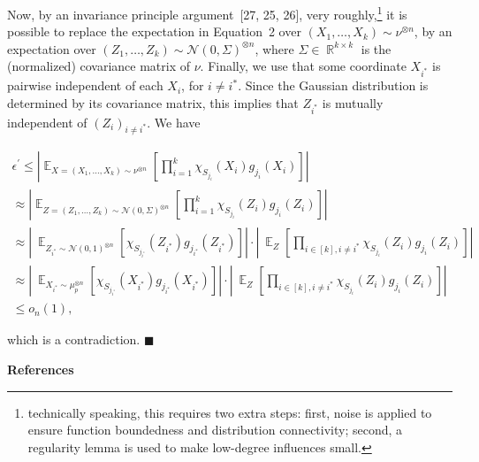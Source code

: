 \documentclass[10pt,a4paper]{article}
\begin{document}
Now, by an invariance principle argument [27, 25, 26], very roughly,\footnote{technically speaking, this requires two extra steps: first, noise is applied to ensure function boundedness and distribution connectivity; second, a regularity lemma is used to make low-degree influences small.} it is possible to replace the expectation in Equation 2 over $(X_{1},\dots,X_{k})\sim\nu^{\otimes n}$, by an expectation over $(Z_{1},\dots,Z_{k})\sim\mathcal{N}(0,\Sigma)^{\otimes n}$, where $\Sigma\in\mathop{\mathbb{R}}^{k\times k}$ is the (normalized) covariance matrix of $\nu$.
Finally, we use that some coordinate $X_{i^{*}}$ is pairwise independent of each $X_{i}$, for $i\not=i^{*}$.
Since the Gaussian distribution is determined by its covariance matrix, this implies that $Z_{i^{*}}$ is mutually independent of $(Z_{i})_{i\not=i^{*}}$.
We have\par


\[\begin{gathered}
\displaystyle\epsilon^{\prime} \displaystyle\leqslant\left|\mathop{\mathbb{E}}_{X=(X_{1},\dots,X_{k})\sim\nu^{\otimes n}}\left[\prod_{i=1}^{k}\chi_{S_{j_{i}}}(X_{i})g_{j_{i}}(X_{i})\right]\right| \\
\displaystyle\approx\left|\mathop{\mathbb{E}}_{Z=(Z_{1},\dots,Z_{k})\sim\mathcal{N}(0,\Sigma)^{\otimes n}}\left[\prod_{i=1}^{k}\chi_{S_{j_{i}}}(Z_{i})g_{j_{i}}(Z_{i})\right]\right| \\
\displaystyle\approx\left|\ \mathop{\mathbb{E}}_{Z_{i^{*}}\sim\mathcal{N}(0,1)^{\otimes n}}\left[\chi_{S_{j_{i^{*}}}}(Z_{i^{*}})g_{j_{i^{*}}}(Z_{i^{*}})\right]\right|\cdot\left|\ \mathop{\mathbb{E}}_{Z}\left[\prod_{i\in[k],i\not=i^{*}}\chi_{S_{j_{i}}}(Z_{i})g_{j_{i}}(Z_{i})\right]\right| \\
\displaystyle\approx\left|\ \mathop{\mathbb{E}}_{X_{i^{*}}\sim\mu_{p}^{\otimes
n}}\left[\chi_{S_{j_{i^{*}}}}(X_{i^{*}})g_{j_{i^{*}}}(X_{i^{*}})\right]\right|\cdot\left|\ \mathop{\mathbb{E}}_{Z}\left[\prod_{i\in[k],i\not=i^{*}}\chi_{S_{j_{i}}}(Z_{i})g_{j_{i}}(Z_{i})\right]\right| \\
\displaystyle\leqslant o_{n}(1),
\end{gathered}\]


which is a contradiction.
\ensuremath{\blacksquare}\par






\par\medskip\noindent\textbf{References}\par
\end{document}
